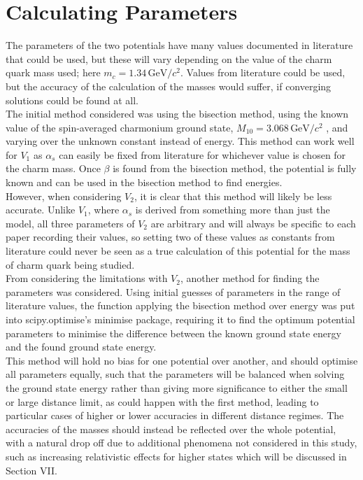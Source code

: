 \documentclass[10pt, twocolumn]{article}
\begin{document}
\section{Calculating Parameters}
The parameters of the two potentials have many values documented in literature that could be used, but these will vary depending on the value of the charm quark mass used; here $m_c = 1.34\,\text{GeV}/c^2$\cite{11}. 
Values from literature could be used, but the accuracy of the calculation of the masses would suffer, if converging solutions could be found at all.\\
The initial method considered was using the bisection method, using the known value of the spin-averaged charmonium ground state, $M_{10} = 3.068\,\text{GeV}/c^2$ \cite{10}, and varying over the unknown constant instead of energy.
This method can work well for $V_1$ as $\alpha_s$ can easily be fixed from literature for whichever value is chosen for the charm mass. 
Once $\beta$ is found from the bisection method, the potential is fully known and can be used in the bisection method to find energies. \\
However, when considering $V_2$, it is clear that this method will likely be less accurate.
Unlike $V_1$, where $\alpha_s$ is derived from something more than just the model, all three parameters of $V_2$ are arbitrary and will always be specific to each paper recording their values, so setting two of these values as constants from literature could never be seen as a true calculation of this potential for the mass of charm quark being studied.\\
From considering the limitations with $V_2$, another method for finding the parameters was considered. 
Using initial guesses of parameters in the range of literature values, the function applying the bisection method over energy was put into scipy.optimise's minimise package, requiring it to find the optimum potential parameters to minimise the difference between the known ground state energy and the found ground state energy. \\
This method will hold no bias for one potential over another, and should optimise all parameters equally, such that the parameters will be balanced when solving the ground state energy rather than giving more significance to either the small or large distance limit, as could happen with the first method, leading to particular cases of higher or lower accuracies in different distance regimes.
The accuracies of the masses should instead be reflected over the whole potential, with a natural drop off due to additional phenomena not considered in this study, such as increasing relativistic effects for higher states which will be discussed in Section \RN{7}.
\end{document}
